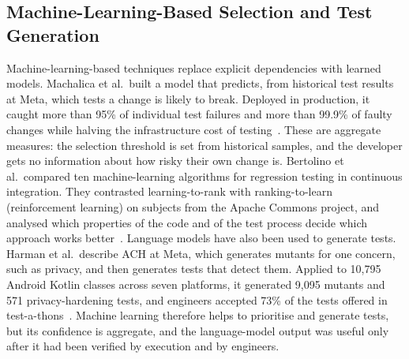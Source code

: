 \documentclass[conference]{IEEEtran}
\begin{document}
\subsection{Machine-Learning-Based Selection and Test Generation}
Machine-learning-based techniques replace explicit dependencies with learned models. Machalica et al.\ built a model that predicts, from historical test results at Meta, which tests a change is likely to break. Deployed in production, it caught more than 95\% of individual test failures and more than 99.9\% of faulty changes while halving the infrastructure cost of testing~\cite{machalica2019pts}. These are aggregate measures: the selection threshold is set from historical samples, and the developer gets no information about how risky their own change is. Bertolino et al.\ compared ten machine-learning algorithms for regression testing in continuous integration. They contrasted learning-to-rank with ranking-to-learn (reinforcement learning) on subjects from the Apache Commons project, and analysed which properties of the code and of the test process decide which approach works better~\cite{bertolino2020learning}. Language models have also been used to generate tests. Harman et al.\ describe ACH at Meta, which generates mutants for one concern, such as privacy, and then generates tests that detect them. Applied to 10,795 Android Kotlin classes across seven platforms, it generated 9,095 mutants and 571 privacy-hardening tests, and engineers accepted 73\% of the tests offered in test-a-thons~\cite{foster2025ach}. Machine learning therefore helps to prioritise and generate tests, but its confidence is aggregate, and the language-model output was useful only after it had been verified by execution and by engineers.
\end{document}
